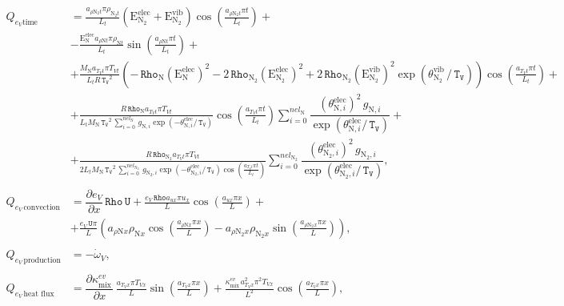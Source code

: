 \documentclass[10pt]{article}
\newcommand{\diff}[2] {\dfrac{\partial #1 }{\partial #2}}
\newcommand{\Rho}{\,\mathtt{Rho}}
\newcommand{\U}{\,\mathtt{U}}
\newcommand{\TV}{\,\mathtt{T_V}}
\newcommand{\N}{\text{N}}
\newcommand{\elec}{\text{elec}}
\newcommand{\vib}{\text{vib}}
\newcommand{\E}{\text{E}}
\newcommand{\mix}{\text{mix}\,}
\newcommand{\DKappaevDx}{\diff{\kappa^{ev}_{\mix}}{x}\,}
\newcommand{\DeVDx}{\diff{e_V}{x}}
\newcommand{\convection}{\,\text{convection}}
\newcommand{\production}{\,\text{production}}
\newcommand{\diffusion}{\,\text{diffusion}}
\newcommand{\heatflux}{\,\text{heat flux}}
\newcommand{\eelecNden}{\,\sum_{i=0}^{nel_{\N}}   \, g_{\N,i}   \exp \left( -\theta^{\elec}_{\N,i} / \TV  \right) }
\newcommand{\eelecNdoisden}{\,\sum_{i=0}^{nel_{\N_2}}  \, g_{\N_2,i}   \exp \left( -\theta^{\elec}_{\N_2,i} /  \TV \right)}
\begin{document}
\begin{equation*}
\begin{split}
%
% 
Q_{e_V \text{time}} &= 
\frac{a_{ \rho \N_2 t} \pi \rho_{\N_2 t} }{L_t}\left(\E^{\elec}_{\N_2} + \E^{\vib}_{\N_2} \right) \cos\left(\frac{a_{ \rho \N_2 t}
\pi t}{L_t}\right) +\\ 
%
&- \frac{\E^{\elec}_{\N} a_{ \rho \N t} \pi \rho_{\N t} }{L_t}\sin\left(\frac{a_{ \rho \N t} \pi t}{L_t}\right) +\\ 
%
& + \frac{M_{\N} a_{T_V t} \pi T_{Vt} }{L_t R \TV^{2}}\left(- \Rho_{\N} \left( \E^{\elec}_{\N} \right)^2 - 2 \Rho_{\N_2} \left(
\E^{\elec}_{\N_2} \right)^2 + 2 \Rho_{\N_2} \left( \E^{\vib}_{\N_2} \right)^2 \exp\left( \theta^{\vib}_{\N_2} \, / \TV \right)
\right) \cos\left(\frac{a_{T_V t} \pi t}{L_t}\right) +\\
%
& + \frac{R \Rho_{\N} a_{T_V t} \pi T_{Vt} }{L_t M_{\N} \TV^{2} \eelecNden}\cos\left(\frac{a_{T_V t} \pi t}{L_t}\right)
\sum_{i=0}^{nel_{\N}} \dfrac{ \left( \theta^{\elec}_{\N,i} \right)^2   \, g_{\N,i} }{ \exp \left( \theta^{\elec}_{\N,i} / \TV
\right)} +\\
%
& + \frac{R \Rho_{\N_2} a_{T_V t} \pi T_{Vt} }{2 L_t M_{\N}\TV^{2} \eelecNdoisden \cos\left(\frac{a_{T_V t} \pi t}{L_t}\right)}
\sum_{i=0}^{nel_{\N_2}} \dfrac{ \left( \theta^{\elec}_{\N_2,i} \right)^2   \, g_{\N_2,i} }{ \exp \left( \theta^{\elec}_{\N_2,i} / 
\TV \right)} ,\\
&\\
%
 Q_{e_V \convection} &= \DeVDx \Rho \U + \frac{e_V \Rho a_{ux} \pi u_{x} }{L}\cos\left(\frac{a_{ux} \pi x}{L}\right)+\\
%
&+ \frac{e_V \U \pi }{L}\left(a_{ \rho \N x} \rho_{\N x} \cos\left(\frac{a_{ \rho \N x} \pi x}{L}\right) - a_{ \rho \N_2 x}
\rho_{\N_2 x} \sin\left(\frac{a_{ \rho \N_2 x} \pi x}{L}\right)\right) ,\\
%
&\\
%
 Q_{e_V \production} &= - \dot{\omega}_V,\\
%
&\\
%
 Q_{e_V \heatflux} &= \DKappaevDx \frac{ a_{T_V x} \pi T_{Vx} }{L}\sin\left(\frac{a_{T_V x} \pi x}{L}\right) +
\frac{\kappa^{ev}_{\mix} a_{T_V x}^{2} \pi^{2} T_{Vx}}{L^{2}} \cos\left(\frac{a_{T_V x} \pi x}{L}\right),\\
%
\end{split}
\end{equation*}
\end{document}
